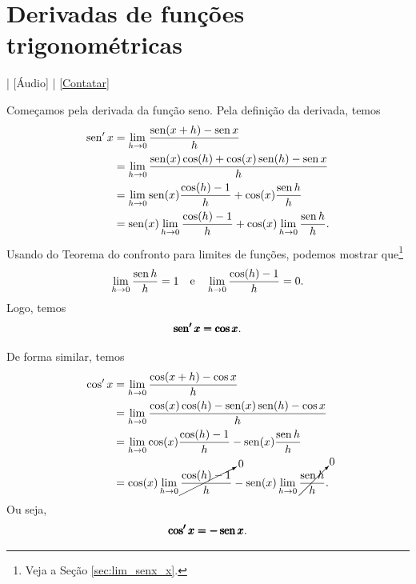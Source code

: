 \section{Derivadas de funções trigonométricas}\label{cap_deriv_sec_trigo}

\begin{flushright}
  [Vídeo] | [Áudio] | \href{https://phkonzen.github.io/notas/contato.html}{[Contatar]}
\end{flushright}

Começamos pela derivada da função seno. Pela definição da derivada, temos
\begin{align}
  \operatorname{sen}' x &= \lim_{h\to 0} \frac{\operatorname{sen}(x+h) - \operatorname{sen} x}{h} \\
            &= \lim_{h\to 0} \frac{\operatorname{sen}(x)\cos(h)+\cos(x)\operatorname{sen}(h) - \operatorname{sen} x}{h} \\
            &= \lim_{h\to 0} \operatorname{sen}(x)\frac{\cos(h) - 1}{h} + \cos(x)\frac{\operatorname{sen} h}{h}\\
            &= \operatorname{sen}(x) \lim_{h\to 0} \frac{\cos(h)-1}{h} + \cos(x)\lim_{h\to 0} \frac{\operatorname{sen} h}{h}.
\end{align}
Usando do Teorema do confronto para limites de funções, podemos mostrar que\footnote{Veja a Seção \ref{sec:lim_senx_x}.}
\begin{equation}
  \lim_{h\to 0} \frac{\operatorname{sen} h}{h} = 1\quad\text{e}\quad\lim_{h\to 0} \frac{\cos(h) - 1}{h} = 0.
\end{equation}
Logo, temos
\begin{equation}
  \pmb{\operatorname{sen}' x = \cos x}.
\end{equation}

De forma similar, temos
\begin{align}
  \cos' x &= \lim_{h\to 0} \frac{\cos(x+h) - \cos x}{h} \\
            &= \lim_{h\to 0} \frac{\cos(x)\cos(h)-\operatorname{sen}(x)\operatorname{sen}(h) - \cos x}{h} \\
            &= \lim_{h\to 0} \cos(x)\frac{\cos(h) - 1}{h} - \operatorname{sen}(x)\frac{\operatorname{sen} h}{h}\\
            &= \cos(x) \lim_{h\to 0} \cancelto{0}{\frac{\cos(h)-1}{h}} - \operatorname{sen}(x)\lim_{h\to 0} \cancelto{0}{\frac{\operatorname{sen} h}{h}}.
\end{align}
Ou seja,
\begin{equation}
  \pmb{\cos' x = -\operatorname{sen} x}.
\end{equation}

